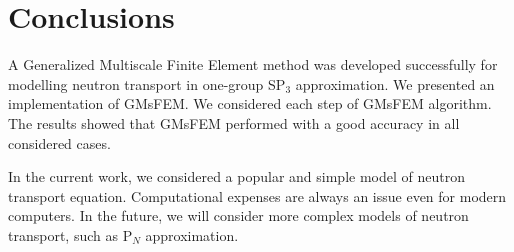 \documentclass[preprint]{elsarticle}
\begin{document}
\section{Conclusions}
A Generalized Multiscale Finite Element method was developed successfully for modelling neutron transport in one-group SP$_3$ approximation.  
We presented an implementation of GMsFEM. 
We considered each step of GMsFEM algorithm.
The results showed that GMsFEM performed with a good accuracy in all considered cases.

In the current work, we considered a popular and simple model of neutron transport equation.
Computational expenses are always an issue even for modern computers.
In the future, we will consider more complex models of neutron transport, such as P$_N$ approximation. 

\end{document}
